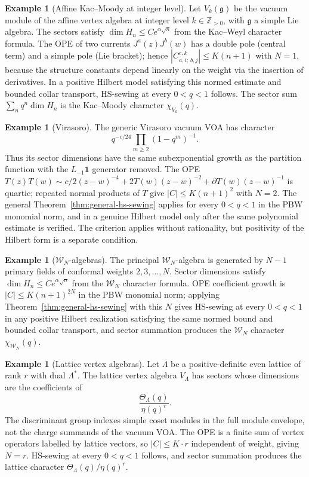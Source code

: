\documentclass[11pt,reqno]{amsart}
\theoremstyle{definition}
\newtheorem{example}[theorem]{Example}
\theoremstyle{remark}
\newcommand{\cW}{\mathcal{W}}
\newcommand{\fg}{\mathfrak{g}}
\numberwithin{equation}{section}
\begin{document}
\begin{example}[Affine Kac--Moody at integer level]
\label{ex:kac-moody}
Let $V_k(\fg)$ be the vacuum module of the affine vertex algebra
at integer level $k \in \mathbb{Z}_{> 0}$, with $\fg$ a simple
Lie algebra. The sectors satisfy
$\dim H_n \leq C e^{\alpha\sqrt n}$ from the Kac--Weyl character
formula. The OPE of two currents
$J^a(z)J^b(w)$ has a double pole (central term) and a simple
pole (Lie bracket); hence
$|C^{c,k}_{a,i;\,b,j}| \leq K(n+1)$ with $N = 1$, because the
structure constants depend linearly on the weight via the
insertion of derivatives. In a positive Hilbert model satisfying
this normed estimate and bounded collar transport, HS-sewing at
every $0<q<1$ follows. The sector sum
$\sum_n q^n\dim H_n$ is the Kac--Moody character $\chi_{V_k}(q)$.
\end{example}

\begin{example}[Virasoro]\label{ex:virasoro}
The generic Virasoro vacuum VOA has character
\[
q^{-c/24}\prod_{m\ge2}(1-q^m)^{-1}.
\]
Thus its sector dimensions have the same subexponential growth as
the partition function with the $L_{-1}\mathbf 1$ generator removed.
The OPE
$T(z)T(w) \sim c/2(z-w)^{-4} + 2T(w)(z-w)^{-2}
+ \partial T(w)(z-w)^{-1}$
is quartic; repeated normal products of $T$ give
$|C| \leq K(n+1)^2$ with $N = 2$. The general
Theorem~\ref{thm:general-hs-sewing} applies for every
$0 < q < 1$ in the PBW monomial norm, and in a genuine Hilbert
model only after the same polynomial estimate is verified. The
criterion applies without rationality, but positivity of the
Hilbert form is a separate condition.
\end{example}

\begin{example}[$\cW_N$-algebras]\label{ex:wn}
The principal $\cW_N$-algebra is generated by $N - 1$ primary
fields of conformal weights $2, 3, \ldots, N$. Sector
dimensions satisfy $\dim H_n \leq C e^{\alpha\sqrt n}$ from
the $\cW_N$ character formula. OPE coefficient growth is
$|C| \leq K(n+1)^{2N}$ in the PBW monomial norm; applying
Theorem~\ref{thm:general-hs-sewing} with this $N$ gives
HS-sewing at every $0 < q < 1$ in any positive Hilbert
realization satisfying the same normed bound and bounded collar
transport, and sector summation
produces the $\cW_N$ character $\chi_{\cW_N}(q)$.
\end{example}

\begin{example}[Lattice vertex algebras]\label{ex:lattice}
Let $\Lambda$ be a positive-definite even lattice of rank $r$
with dual $\Lambda^*$. The lattice vertex algebra $V_\Lambda$
has sectors whose dimensions are the coefficients of
\[
\frac{\Theta_\Lambda(q)}{\eta(q)^r}.
\]
The discriminant group indexes simple coset modules in the full
module envelope, not the charge summands of the vacuum VOA. The OPE
is a finite sum of
vertex operators labelled by lattice vectors, so
$|C| \leq K \cdot r$ independent of weight, giving $N = r$.
HS-sewing at every $0 < q < 1$ follows, and sector summation
produces the lattice character
$\Theta_\Lambda(q)/\eta(q)^r$.
\end{example}
\end{document}
